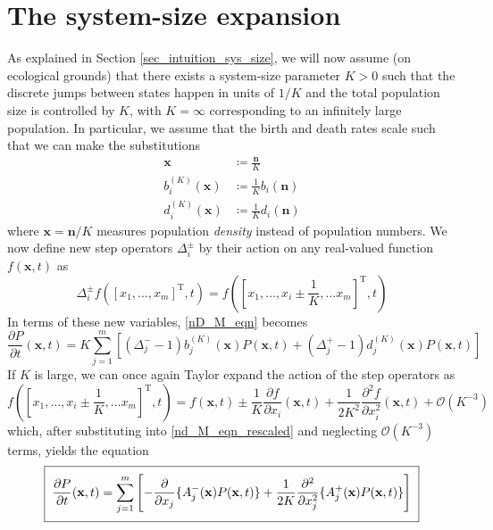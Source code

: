 \section{The system-size expansion}
As explained in Section \ref{sec_intuition_sys_size}, we will now assume (on ecological grounds) that there exists a system-size parameter $K > 0$ such that the discrete jumps between states happen in units of $1/K$ and the total population size is controlled by $K$, with $K = \infty$ corresponding to an infinitely large population. In particular, we assume that the birth and death rates scale such that we can make the substitutions
\begin{align*}
\mathbf{x} &\coloneqq \frac{\mathbf{n}}{K}\\
b^{(K)}_i(\mathbf{x}) &\coloneqq \frac{1}{K}b_i(\mathbf{n})\\
d^{(K)}_i(\mathbf{x}) &\coloneqq \frac{1}{K}d_i(\mathbf{n})
\end{align*}
where $\mathbf{x} = \mathbf{n}/K$ measures population \emph{density} instead of population numbers. We now define new step operators $\Delta_{i}^{\pm}$ by their action on any real-valued function $f(\mathbf{x},t)$ as
\begin{equation}
\label{nD_step_operators_rescaled}
\Delta_{i}^{\pm}f([x_1,\ldots,x_m]^{\mathrm{T}},t) = f([x_1,\ldots,x_i \pm \frac{1}{K}, \ldots x_m]^{\mathrm{T}},t)
\end{equation}
In terms of these new variables, \eqref{nD_M_eqn} becomes
\begin{equation}
\label{nd_M_eqn_rescaled}
\frac{\partial P}{\partial t}(\mathbf{x},t) = K\sum\limits_{j=1}^{m}\left[(\Delta_j^{-}-1)b^{(K)}_j(\mathbf{x})P(\mathbf{x},t) + (\Delta_j^{+}-1)d^{(K)}_j(\mathbf{x})P(\mathbf{x},t)\right]
\end{equation}
If $K$ is large, we can once again Taylor expand the action of the step operators as
\begin{equation*}
f([x_1,\ldots,x_i \pm \frac{1}{K}, \ldots x_m]^{\mathrm{T}},t) = f(\mathbf{x},t) \pm \frac{1}{K}\frac{\partial f}{\partial x_i}(\mathbf{x},t) + \frac{1}{2K^2}\frac{\partial^2f}{\partial x_i^2}(\mathbf{x},t) + \mathcal{O}(K^{-3})
\end{equation*}
which, after substituting into \eqref{nd_M_eqn_rescaled} and neglecting $ \mathcal{O}(K^{-3})$ terms, yields the equation
\begin{equation}
\label{nD_FPE}
\setlength{\fboxsep}{2\fboxsep}\boxed{\frac{\partial P}{\partial t}(\mathbf{x},t) = \sum\limits_{j=1}^{m}\left[-\frac{\partial}{\partial x_j}\{A_j^{-}(\mathbf{x})P(\mathbf{x},t)\} + \frac{1}{2K}\frac{\partial^2}{\partial x_j^2}\{A_j^{+}(\mathbf{x})P(\mathbf{x},t)\}\right]}
\end{equation}

